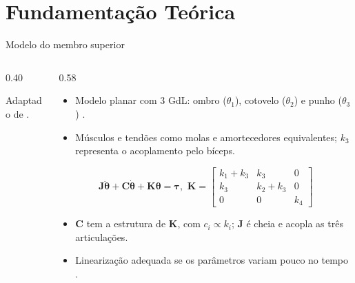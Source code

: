 \section{Fundamentação Teórica}

\begin{frame}{Modelo do membro superior}
  \begin{columns}[c]
    \begin{column}{0.40\textwidth}
      \centering
      \resizebox{!}{0.68\textheight}{\upperlimbschematic}

      {\scriptsize Adaptado de \textcite{Albuquerque:2025}.}
    \end{column}
    \begin{column}{0.58\textwidth}
      \begin{itemize}[<+->]
        \item Modelo planar com 3 GdL: ombro ($\theta_1$), cotovelo ($\theta_2$) e punho ($\theta_3$) \cite{Gebai:2018}.
        \item Músculos e tendões como molas e amortecedores equivalentes; $k_3$ representa o acoplamento pelo bíceps.
      \end{itemize}
      \pause
      \begin{equation*}
        \mathbf{J}\ddot{\bm{\theta}} + \mathbf{C}\dot{\bm{\theta}} + \mathbf{K}\bm{\theta} = \bm{\tau},
        \,\,
        \mathbf{K} =
        \begin{bmatrix}
          k_1 + k_3 & k_3       & 0   \\
          k_3       & k_2 + k_3 & 0   \\
          0         & 0         & k_4
        \end{bmatrix}
      \end{equation*}
      \begin{itemize}[<+->]
        \item $\mathbf{C}$ tem a estrutura de $\mathbf{K}$, com $c_i \propto k_i$; $\mathbf{J}$ é cheia e acopla as três articulações.
        \item Linearização adequada se os parâmetros variam pouco no tempo \cite{Gebai:2020}.
      \end{itemize}
    \end{column}
  \end{columns}
\end{frame}


